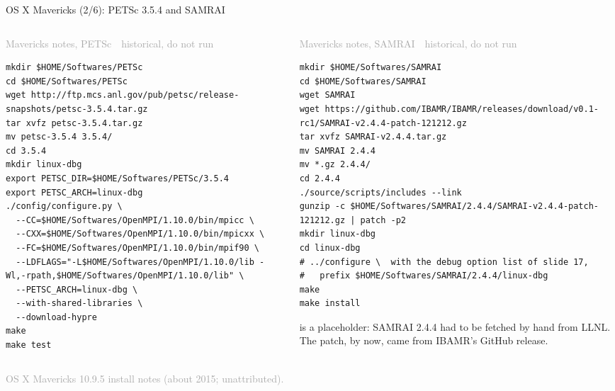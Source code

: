 \documentclass[aspectratio=169,11pt]{beamer}
\newcommand{\sourcecredit}[1]{\vfill\begin{flushright}\tiny\textcolor{DarkGray}{#1}\end{flushright}}
\newcommand{\hist}[1]{{\tiny\sffamily\textcolor{DarkGray}{#1\ \textbullet\ historical, do not run}}\par\nointerlineskip\vspace{0.3mm}}
\begin{document}
\begin{frame}[fragile]{OS X Mavericks (2/6): PETSc 3.5.4 and SAMRAI}
\label{fr:mav2}
\begin{columns}[T,onlytextwidth]
\begin{column}{0.5\textwidth}
\hist{Mavericks notes, PETSc}
\begin{lstlisting}[style=hist]
mkdir $HOME/Softwares/PETSc
cd $HOME/Softwares/PETSc
wget http://ftp.mcs.anl.gov/pub/petsc/release-snapshots/petsc-3.5.4.tar.gz
tar xvfz petsc-3.5.4.tar.gz
mv petsc-3.5.4 3.5.4/
cd 3.5.4
mkdir linux-dbg
export PETSC_DIR=$HOME/Softwares/PETSc/3.5.4
export PETSC_ARCH=linux-dbg
./config/configure.py \
  --CC=$HOME/Softwares/OpenMPI/1.10.0/bin/mpicc \
  --CXX=$HOME/Softwares/OpenMPI/1.10.0/bin/mpicxx \
  --FC=$HOME/Softwares/OpenMPI/1.10.0/bin/mpif90 \
  --LDFLAGS="-L$HOME/Softwares/OpenMPI/1.10.0/lib -Wl,-rpath,$HOME/Softwares/OpenMPI/1.10.0/lib" \
  --PETSC_ARCH=linux-dbg \
  --with-shared-libraries \
  --download-hypre
make
make test
\end{lstlisting}
\end{column}
\begin{column}{0.47\textwidth}
\hist{Mavericks notes, SAMRAI}
\begin{lstlisting}[style=hist]
mkdir $HOME/Softwares/SAMRAI
cd $HOME/Softwares/SAMRAI
wget SAMRAI
wget https://github.com/IBAMR/IBAMR/releases/download/v0.1-rc1/SAMRAI-v2.4.4-patch-121212.gz
tar xvfz SAMRAI-v2.4.4.tar.gz
mv SAMRAI 2.4.4
mv *.gz 2.4.4/
cd 2.4.4
./source/scripts/includes --link
gunzip -c $HOME/Softwares/SAMRAI/2.4.4/SAMRAI-v2.4.4-patch-121212.gz | patch -p2
mkdir linux-dbg
cd linux-dbg
# ../configure \  with the debug option list of slide 17,
#   prefix $HOME/Softwares/SAMRAI/2.4.4/linux-dbg
make
make install
\end{lstlisting}
\footnotesize {} is a placeholder: SAMRAI 2.4.4 had to be fetched by hand from LLNL. The patch, by now, came from IBAMR's GitHub release.
\end{column}
\end{columns}
\sourcecredit{OS X Mavericks 10.9.5 install notes (about 2015; unattributed).}
\end{frame}
\end{document}
